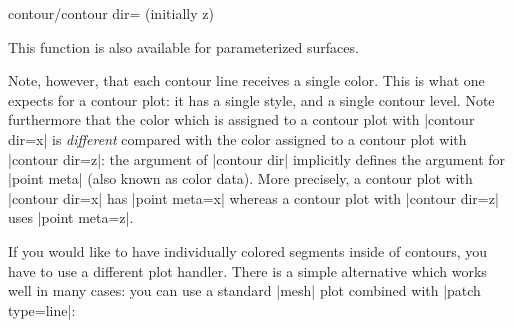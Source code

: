 {{\begin{pgfplotskey}{contour/contour dir= (initially z)}
\pgfplotsexpensiveexample
\begin{codeexample}[]
\end{codeexample}

    This function is also available for parameterized surfaces.

\pgfplotsexpensiveexample
\begin{codeexample}[]
\end{codeexample}

    Note, however, that each contour line receives a single color. This is what
    one expects for a contour plot: it has a single style, and a single contour
    level. Note furthermore that the color which is assigned to a contour plot
    with |contour dir=x| is \emph{different} compared with the color assigned
    to a contour plot with |contour dir=z|: the argument of |contour dir|
    implicitly defines the argument for |point meta| (also known as color
    data). More precisely, a contour plot with |contour dir=x| has
    |point meta=x| whereas a contour plot with |contour dir=z| uses
    |point meta=z|.

    If you would like to have individually colored segments inside of contours,
    you have to use a different plot handler. There is a simple alternative
    which works well in many cases: you can use a standard |mesh| plot combined
    with |patch type=line|:

\pgfplotsexpensiveexample
\begin{codeexample}[]
\end{codeexample}


\end{pgfplotskey}}}
